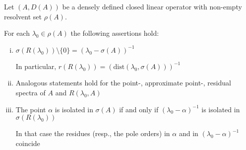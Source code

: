 \begin{proposition}\label{prop:a3-2.5}

Let $(A,D(A))$ be a densely defined closed linear operator with non-empty resolvent set $\rho(A)$.

For each $\lambda_{0} \in \rho(A)$ the following assertions hold:

\begin{enumerate}[(i)]
\item $\sigma(R(\lambda_{0})) \setminus \{0\} = (\lambda_{0} - \sigma(A))^{-1}$

In particular, $r(R(\lambda_{0})) = (\text{dist}(\lambda_{0},\sigma(A)))^{-1}$

\item Analogous statements hold for the point-, approximate point-, residual spectra of $A$ and $R(\lambda_{0},A)$

\item The point $\alpha$ is isolated in $\sigma(A)$ if and only if $(\lambda_{0}-\alpha)^{-1}$ is isolated in $\sigma(R(\lambda_{0}))$

In that case the residues (resp., the pole orders) in $\alpha$ and in $(\lambda_{0}-\alpha)^{-1}$ coincide
\end{enumerate}
\end{proposition}

